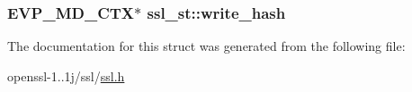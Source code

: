 \hypertarget{structssl__st_a491e1c0b9386b4003bb443af4a2d06d4}{
\subsubsection[{write\-\_\-hash}]{\setlength{\rightskip}{0pt plus 5cm}E\-V\-P\-\_\-\-M\-D\-\_\-\-C\-T\-X$\ast$ ssl\-\_\-st\-::write\-\_\-hash}}\label{structssl__st_a491e1c0b9386b4003bb443af4a2d06d4}


The documentation for this struct was generated from the following file\-:\begin{DoxyCompactItemize}
\item 
openssl-\/1..\-1j/ssl/\hyperlink{ssl_8h}{ssl.\-h}\end{DoxyCompactItemize}

